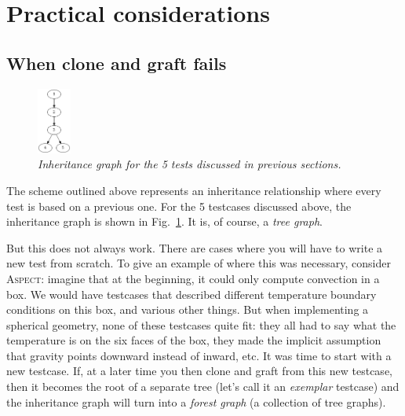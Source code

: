 \documentclass{article}
\newcommand{\aspect}{\textsc{Aspect}}
\begin{document}
\section{Practical considerations}
\label{sec:practice}

\subsection{When clone and graft fails}

\begin{figure}
  \begin{center}
    \vspace*{-24pt}
    \includegraphics[width=0.1\textwidth]{figures/inheritance.png}
    \vspace*{-12pt}
  \end{center}
  \caption{\it Inheritance graph for the 5 tests discussed in previous sections.}
  \vspace*{-3mm}
  \label{fig:inheritance}
\end{figure}
The scheme outlined above represents an inheritance relationship where every
test is based on a previous one. For the 5 testcases discussed above, the
inheritance graph is shown in Fig.~\ref{fig:inheritance}. It is, of course, a
\textit{tree graph}.

But this does not always work. There are cases where you will have to write a
new test from scratch. To give an example of where this was necessary,
consider \aspect{}: imagine that at the beginning, it could only compute
convection in a box. We would have testcases that described different
temperature boundary conditions on this box, and various other things. But
when implementing a spherical geometry, none of these testcases quite fit:
they all had to say what the temperature is on the six faces of the box, they
made the implicit assumption that gravity points downward instead of inward,
etc. It was time to start with a new testcase. If, at a later time you then
clone and graft from this new testcase, then it becomes the root of a separate
tree (let's call it an \textit{exemplar} testcase) and the inheritance graph
will turn into a \textit{forest graph} (a collection of tree graphs).
\end{document}
